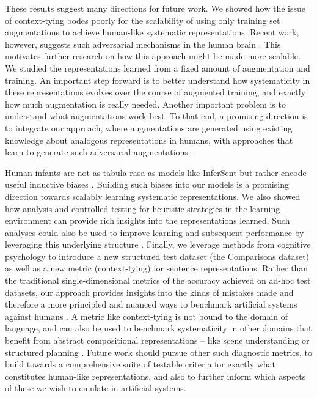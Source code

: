 These results suggest many directions for future work. We showed how the issue of context-tying bodes poorly for the scalability of using only training set augmentations to achieve human-like systematic representations. Recent work, however, suggests such adversarial mechanisms in the human brain \citep{gershman2019generative}. This motivates further research on how this approach might be made more scalable. We studied the representations learned from a fixed amount of augmentation and training. An important step forward is to better understand how systematicity in these representations evolves over the course of augmented training, and exactly how much augmentation is really needed. Another important problem is to understand what augmentations work best. To that end, a promising direction is to integrate our approach, where augmentations are generated using existing knowledge about analogous representations in humans, with approaches that learn to generate such adversarial augmentations \citep{kang2018adventure,goodfellow2014explaining, zhao2017generating}.

Human infants are not as tabula rasa as models like InferSent but rather encode useful inductive biases \citep{mitchell1980need, pearl2016statistical, chomsky2002syntactic, lightfoot1984language, seidenberg1997language}. Building such biases into our models \citep{lake18, gandhi2019mutual, dubey2018investigating, battaglia2018relational} is a promising direction towards scalably learning systematic representations. We also showed how analysis and controlled testing for heuristic strategies in the learning environment can provide rich insights into the representations learned. Such analyses could also be used to improve learning and subsequent performance by leveraging this underlying structure \citep{csimcsek2013linear, csimcsek2016most, gigerenzer1999simple, martignon2002fast}. Finally, we leverage methods from cognitive psychology to introduce a new structured test dataset (the Comparisons dataset) as well as a new metric (context-tying) for sentence representations. Rather than the traditional single-dimensional metrics of the accuracy achieved on ad-hoc test datasets, our approach provides insights into the kinds of mistakes made and therefore a more principled and nuanced ways to benchmark artificial systems against humans \citep{white2017inference, marelli2014semeval, lake17, linzen2016assessing, mccoy2019right, glockner2018breaking}. A metric like context-tying is not bound to the domain of language, and can also be used to benchmark systematicity in other domains that benefit from abstract compositional representations -- like scene understanding \citep{ommer2009learning, johnson2017clevr} or structured planning \citep{burridge1999sequential, singh1992transfer}. Future work should pursue other such diagnostic metrics, to build towards a comprehensive suite of testable criteria for exactly what constitutes human-like representations, and also to further inform which aspects of these we wish to emulate in artificial systems.

